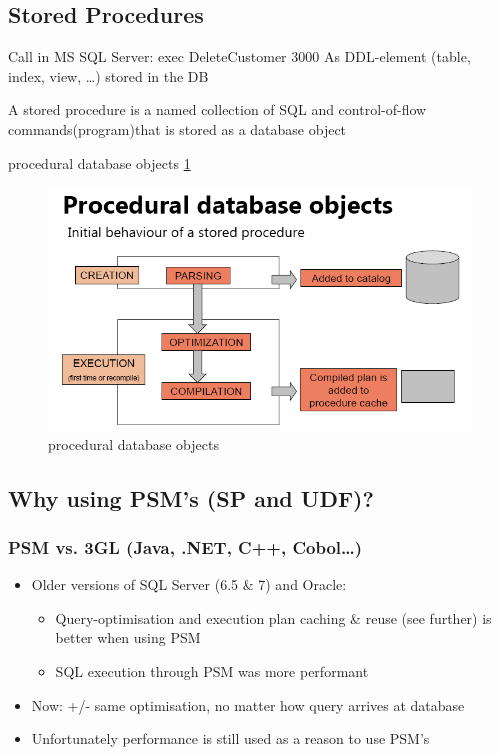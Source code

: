 \documentclass{report}
\begin{document}
    \bigskip
    
    \subsection{Stored Procedures}
    Call in MS SQL Server:
    \linebreak \textendash exec DeleteCustomer 3000
    As DDL-element (table, index, view, \ldots) stored in the DB
    \linebreak
    
    \begin{theo}
        A stored procedure is a named collection of SQL and control-of-flow
        commands(program)that is stored as a database object
    \end{theo}
    
    procedural database objects \ref{fig:proceduralDatabaseObjects}
    \begin{figure}
        \includegraphics[width=400pt]{./images/proceduralDatabaseObjects.png}
        \caption{\label{fig:proceduralDatabaseObjects}procedural database objects}
    \end{figure}

    \subsection{Why using PSM's (SP and UDF)?}
    \subsubsection{PSM vs. 3GL (Java, .NET, C++, Cobol…)}
    \begin{itemize}
        \item Older versions of SQL Server (6.5 \& 7) and Oracle:
        \begin{itemize}
            \item Query-optimisation and execution plan caching \& reuse (see further) is better when using PSM
            \item SQL execution through PSM was more performant
        \end{itemize}
        \item Now: +/- same optimisation, no matter how query arrives at database
        \item Unfortunately performance is still used as a reason to use PSM's
    \end{itemize}
\end{document}
